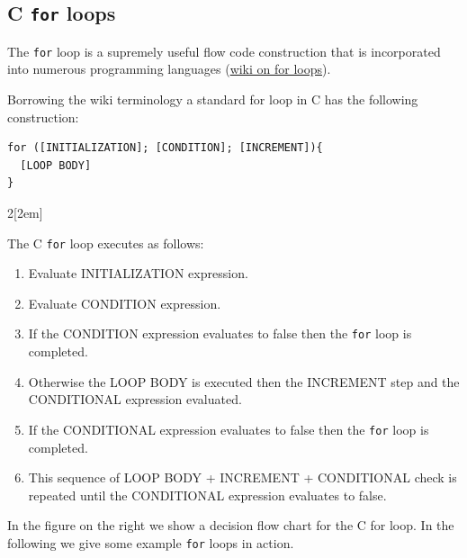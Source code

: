 \newpage
\subsection{C \texttt{for} loops}

The \texttt{for} loop is a supremely useful flow code construction that is incorporated into numerous programming languages (\href{https://en.wikipedia.org/wiki/For_loop#1972:_C/C++}{wiki on for loops}). 

Borrowing the wiki terminology a standard for loop in C has the following construction:
\begin{verbatim}
for ([INITIALIZATION]; [CONDITION]; [INCREMENT]){
  [LOOP BODY]
}
\end{verbatim}

\begin{multicols}{2}[\columnsep2em] 

The C \texttt{for} loop executes as follows: 
\begin{enumerate}
    \item Evaluate INITIALIZATION expression.
    \item Evaluate CONDITION expression. 
    \item If the CONDITION expression evaluates to false then the \texttt{for} loop is completed. 
    \item Otherwise the LOOP BODY is executed then the INCREMENT step and the CONDITIONAL expression evaluated. 
    \item If the CONDITIONAL expression evaluates to false then the \texttt{for} loop is completed.
    \item This sequence of LOOP BODY + INCREMENT + CONDITIONAL check is repeated until the CONDITIONAL expression evaluates to false.  
\end{enumerate}

In the figure on the right we show a decision flow chart for the C for loop. In the following we give some example \texttt{for} loops in action.
\columnbreak

\begin{center}
   \end{center}
\end{multicols}

